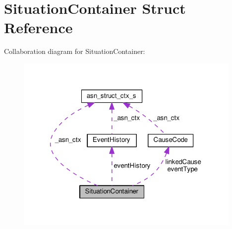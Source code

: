 \hypertarget{structSituationContainer}{}\section{Situation\+Container Struct Reference}
\label{structSituationContainer}


Collaboration diagram for Situation\+Container\+:\nopagebreak
\begin{figure}[H]
\begin{center}
\leavevmode
\includegraphics[width=309pt]{structSituationContainer__coll__graph}
\end{center}
\end{figure}
